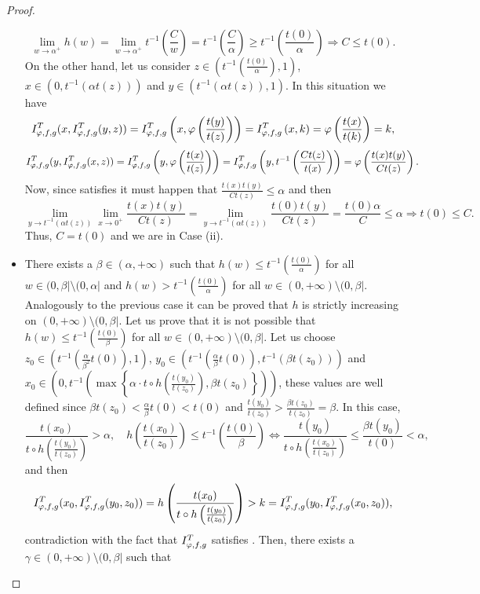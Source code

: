 \begin{proof}
\begin{itemize}
		$$\lim_{w \to \alpha^+} h(w) = \lim_{w \to \alpha^+} t^{-1} \left(\frac{C}{w}\right) = t^{-1} \left(\frac{C}{\alpha}\right) \geq t^{-1} \left(\frac{t(0)}{\alpha}\right) \Rightarrow C \leq t(0).$$
		On the other hand, let us consider $z \in \left(t^{-1}\left(\frac{t(0)}{\alpha}\right),1\right)$, $x \in (0,t^{-1}(\alpha t(z)))$ and $y \in (t^{-1}(\alpha t(z)),1)$. In this situation we have
		$$I^T_{\varphi,f,g}(x,I^T_{\varphi,f,g}(y,z)) = I^T_{\varphi,f,g} \left(x,\varphi \left(\frac{t(y)}{t(z)}\right)\right) = I^T_{\varphi,f,g} \left(x,k\right) = \varphi \left(\frac{t(x)}{t(k)}\right) =k,$$
		$$I^T_{\varphi,f,g}(y,I^T_{\varphi,f,g}(x,z)) = I^T_{\varphi,f,g} \left(y,\varphi \left(\frac{t(x)}{t(z)}\right)\right)=I^T_{\varphi,f,g} \left(y,t^{-1}\left(\frac{Ct(z)}{t(x)}\right)\right) = \varphi \left(\frac{t(x)t(y)}{Ct(z)}\right).$$
		Now, since \IT satisfies \EP it must happen that $\frac{t(x)t(y)}{Ct(z)} \leq \alpha$ and then
		$$\lim_{y \to t^{-1}(\alpha t(z))} \lim_{x \to 0^+} \frac{t(x)t(y)}{Ct(z)} = \lim_{y \to t^{-1}(\alpha t(z))} \frac{t(0)t(y)}{Ct(z)} = \frac{t(0)\alpha}{C} \leq \alpha \Rightarrow t(0) \leq C.$$		
		Thus, $C=t(0)$ and we are in Case (ii).
		\item There exists a $\beta \in (\alpha,+\infty)$ such that $h(w) \leq t^{-1} \left(\frac{t(0)}{\alpha}\right)$ for all $w \in (0,\beta| \setminus (0,\alpha|$ and $h(w)> t^{-1} \left(\frac{t(0)}{\alpha}\right)$ for all $w \in (0,+\infty) \setminus (0,\beta|$. Analogously to the previous case it can be proved that $h$ is strictly increasing on $(0,+\infty) \setminus (0,\beta|$. Let us prove that it is not possible that $h(w) \leq t^{-1} \left(\frac{t(0)}{\beta}\right)$ for all $w \in (0,+\infty) \setminus (0,\beta|$. Let us choose $z_0 \in \left(t^{-1} \left(\frac{\alpha}{\beta^2}t(0)\right),1\right)$, $y_0 \in \left(t^{-1} \left(\frac{\alpha}{\beta}t(0)\right),t^{-1}(\beta t(z_0))\right)$ and $x_0 \in \left(0,t^{-1} \left( \max \left \{ \alpha \cdot t \circ h \left(\frac{t(y_0)}{t(z_0)}\right),\beta t(z_0)\right\}\right)\right)$, these values are well defined since $\beta t(z_0) < \frac{\alpha}{\beta} t(0)<t(0)$ and $\frac{t(y_0)}{t(z_0)} > \frac{\beta t(z_0)}{t(z_0)} = \beta$. In this case,
		$$\frac{t(x_0)}{t \circ h \left(\frac{t(y_0)}{t(z_0)}\right)} > \alpha, \quad h \left(\frac{t(x_0)}{t(z_0)}\right) \leq t^{-1} \left(\frac{t(0)}{\beta}\right) \Leftrightarrow \frac{t(y_0)}{t \circ h \left(\frac{t(x_0)}{t(z_0)}\right)} \leq \frac{\beta t(y_0)}{t(0)} < \alpha,$$
		and then
		$$I^T_{\varphi,f,g}(x_0,I^T_{\varphi,f,g}(y_0,z_0)) = h \left(\frac{t(x_0)}{t \circ h \left(\frac{t(y_0)}{t(z_0)}\right)}\right) > k = I^T_{\varphi,f,g}(y_0,I^T_{\varphi,f,g}(x_0,z_0)),$$
		contradiction with the fact that $I^T_{\varphi,f,g}$ satisfies \EP. Then, there exists a $\gamma \in (0,+\infty) \setminus (0,\beta|$ such that

\end{itemize}
\end{proof}
